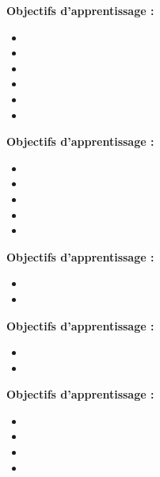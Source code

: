 \par\noindent\textbf{Objectifs d'apprentissage :}
\begin{itemize}
    \item \useobj[C4B1be]
    \item \useobj[C4B1ed]
    \item \useobj[C4B1ee]
    \item \useobj[C4B1ef]
    \item \useobj[C4B1eh]
    \item \useobj[C4B1fh]
\end{itemize}
\endsequence

\par\noindent\textbf{Objectifs d'apprentissage :}
\begin{itemize}
    \item \useobj[C4D1aa]
    \item \useobj[C4D1ab]
    \item \useobj[C4D1ac]
    \item \useobj[C4D1ad]
    \item \useobj[C4D1ae]
\end{itemize}
\endsequence

\par\noindent\textbf{Objectifs d'apprentissage :}
\begin{itemize}
    \item \useobj[C4A1bg]
    \item \useobj[C4A1bh]
\end{itemize}
\endsequence

\par\noindent\textbf{Objectifs d'apprentissage :}
\begin{itemize}
    \item \useobj[C4B1ca]
    \item \useobj[C4B1cb]
\end{itemize}
\endsequence

\par\noindent\textbf{Objectifs d'apprentissage :}
\begin{itemize}
    \item \useobj[C4A1bi]
    \item \useobj[C4A1bk]
    \item \useobj[C4A1bl]
    \item \useobj[C4A1bm]
\end{itemize}
\endsequence

